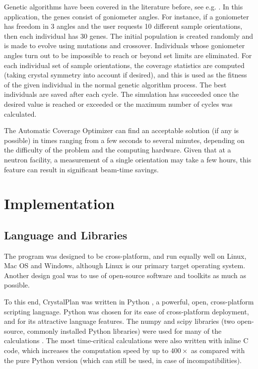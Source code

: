 \documentclass[final]{iucr}              %
\begin{document}
Genetic algorithms have been covered in the literature before, see e.g.
\cite{Goldberg89}. In this application, the genes
consist of goniometer angles. For instance, if a goniometer has freedom in 3 angles and the user
requests 10 different sample orientations, then each individual has 30 genes.
The initial population is created randomly and is made to evolve using mutations
and crossover. Individuals whose goniometer angles turn out to be impossible to
reach or beyond set limits are eliminated. For each individual set of sample
orientations, the coverage statistics are computed (taking crystal symmetry into
account if desired), and this is used as the fitness of the given individual in
the normal genetic algorithm process. The best individuals are saved after each
cycle. The simulation has succeeded once the desired value is reached or
exceeded or the maximum number of cycles was calculated.    

The Automatic Coverage Optimizer can find an acceptable solution (if any is
possible) in times ranging from a few seconds to several minutes, depending on
the difficulty of the problem and the computing hardware. Given that at a
neutron facility, a measurement of a single orientation may take a few
hours, this feature can result in significant beam-time savings.           




\section{Implementation}




\subsection{Language and Libraries}

The program was designed to be cross-platform, and run equally well on Linux,
Mac OS and Windows, although Linux is our primary target operating system. Another
design goal was to use of open-source software and toolkits as much as possible. 

To this end, CrystalPlan was written in Python \cite{python}, a powerful, open,
cross-platform scripting language. Python was chosen for its ease of cross-platform deployment, and for
its attractive language features. The numpy and scipy libraries (two
open-source, commonly installed Python libraries) were used for many of the
calculations \cite{numpy,scipy}. The most time-critical calculations
were also written with inline C code, which increases the computation speed by
up to $400\times$ as compared with the pure Python version (which can still be
used, in case of incompatibilities).
\end{document}
